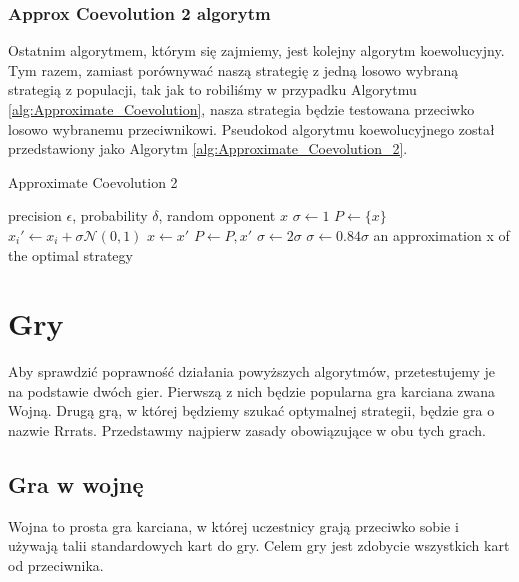 \documentclass[inzynierska]{pwr_wmat_praca_dyplomowa}
\theoremstyle{plain}
\numberwithin{theorem}{chapter}
\theoremstyle{definition}
\numberwithin{theorem}{chapter}
\begin{document}
	\subsection{Approx Coevolution 2 algorytm}
	Ostatnim algorytmem, którym się zajmiemy, jest kolejny algorytm koewolucyjny. Tym razem, zamiast porównywać naszą strategię z jedną losowo wybraną strategią z populacji, tak jak to robiliśmy w przypadku Algorytmu \ref{alg:Approximate_Coevolution}, nasza strategia będzie testowana przeciwko losowo wybranemu przeciwnikowi. Pseudokod algorytmu koewolucyjnego został przedstawiony jako Algorytm \ref{alg:Approximate_Coevolution_2}. 
	\begin{algorithm}\captionsetup{labelformat=custom2}
		\caption{Approximate Coevolution 2}\label{alg:Approximate_Coevolution_2}
		\begin{algorithmic}
			\Ensure  precision $\epsilon$, probability $\delta$, random opponent $x$
			\State $\sigma \gets 1 $ 
			\State $P \gets \{ x \}$ 
			\State $x_i' \gets x_i + \sigma \mathcal{N}(0,1)$ 
			\EndFor
			\State $x \gets x'$
			\State $P \gets {P,x'}$
			\State $\sigma \gets 2\sigma$
			\Else
			\State $\sigma \gets 0.84 \sigma$
			\EndIf
			\EndWhile
			\State \Return an approximation x of the optimal strategy
		\end{algorithmic}
	\end{algorithm}
	
	\chapter{Gry}
	Aby sprawdzić poprawność działania powyższych algorytmów, przetestujemy je na podstawie dwóch gier. Pierwszą z nich będzie popularna gra karciana zwana Wojną. Drugą grą, w której będziemy szukać optymalnej strategii, będzie gra o nazwie Rrrats. Przedstawmy najpierw zasady obowiązujące w obu tych grach.

	\section{Gra w wojnę}
	Wojna to prosta gra karciana, w której uczestnicy grają przeciwko sobie i używają talii standardowych kart do gry. Celem gry jest zdobycie wszystkich kart od przeciwnika.
	
\end{document}
